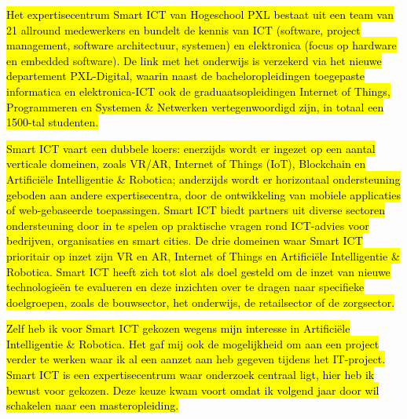 
\hl{Het expertisecentrum Smart ICT van Hogeschool PXL bestaat uit een team van 21 allround medewerkers en bundelt de kennis van ICT (software, project management, software architectuur, systemen) en elektronica (focus op hardware en embedded software). De link met het onderwijs is verzekerd via het nieuwe departement PXL-Digital, waarin naast de bacheloropleidingen toegepaste informatica en elektronica-ICT ook de graduaatsopleidingen Internet of Things, Programmeren en Systemen \& Netwerken vertegenwoordigd zijn, in totaal een 1500-tal studenten.}

\hl{Smart ICT vaart een dubbele koers: enerzijds wordt er ingezet op een aantal verticale domeinen, zoals VR/AR, Internet of Things (IoT), Blockchain en Artifici\"ele Intelligentie \& Robotica; anderzijds wordt er horizontaal ondersteuning geboden aan andere expertisecentra, door de ontwikkeling van mobiele applicaties of web-gebaseerde toepassingen. Smart ICT biedt partners uit diverse sectoren ondersteuning door in te spelen op praktische vragen rond ICT-advies voor bedrijven, organisaties en smart cities. De drie domeinen waar Smart ICT prioritair op inzet zijn VR en AR, Internet of Things en Artifici\"ele Intelligentie \& Robotica. Smart ICT heeft zich tot slot als doel gesteld om de inzet van nieuwe technologie\"en te evalueren en deze inzichten over te dragen naar specifieke doelgroepen, zoals de bouwsector, het onderwijs, de retailsector of de zorgsector.}

\hl{Zelf heb ik voor Smart ICT gekozen wegens mijn interesse in Artifici\"ele Intelligentie \& Robotica. Het gaf mij ook de mogelijkheid om aan een project verder te werken waar ik al een aanzet aan heb gegeven tijdens het IT-project. Smart ICT is een expertisecentrum waar onderzoek centraal ligt, hier heb ik bewust voor gekozen. Deze keuze kwam voort omdat ik volgend jaar door wil schakelen naar een masteropleiding.}